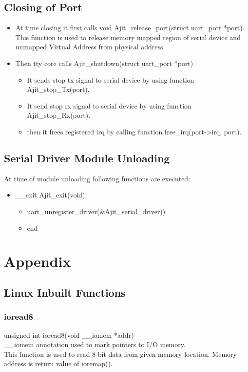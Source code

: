 \documentclass[12pt,a4paper]{article}
\begin{document}
\subsection{Closing of Port}
\begin{itemize}
\item At time closing it first calls void Ajit\_release\_port(struct uart\_port *port). This function is  used to release memory mapped region of serial device and unmapped Virtual Address from physical address.
\item Then tty core calls Ajit\_shutdown(struct uart\_port *port) 
\begin{itemize}
\item It sends stop tx signal to serial device by using function Ajit\_stop\_Tx(port).
\item It send stop rx signal to serial device by using function Ajit\_stop\_Rx(port).
\item then it frees registered irq by calling function free\_irq(port-\textgreater irq, port).
\end{itemize}
\end{itemize}
\subsection{Serial Driver Module Unloading}
At time of module unloading following functions are executed:
\begin{itemize}
\item \_\_exit Ajit\_exit(void).
\begin{itemize}
\item uart\_unregister\_driver(\&Ajit\_serial\_driver))
\item end
\end{itemize}
\end{itemize}


\newpage
\section{Appendix}
\subsection{Linux Inbuilt Functions}
\subsubsection{ioread8}
unsigned int ioread8(void \_\_iomem *addr)\\
\_\_iomem annotation used to mark pointers to I/O memory.\\
This function is used to read 8 bit data from given memory location. Memory address is return value of ioremap().
\end{document}
